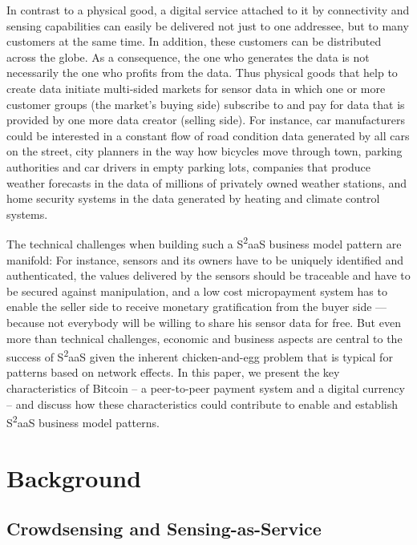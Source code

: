 In contrast to a physical good, a digital service attached to it by connectivity and sensing capabilities can easily be delivered not just to one addressee, but to many customers at the same time. In addition, these customers can be distributed across the globe. As a consequence, the one who generates the data is not necessarily the one who profits from the data. Thus physical goods that help to create data initiate multi-sided markets for sensor data in which one or more customer groups (the market’s buying side) subscribe to and pay for data that is provided by one more data creator (selling side). For instance, car manufacturers could be interested in a constant flow of road condition data generated by all cars on the street, city planners in the way how bicycles move through town, parking authorities and car drivers in empty parking lots, companies that produce weather forecasts in the data of millions of privately owned weather stations, and home security systems in the data generated by heating and climate control systems.

The technical challenges when building such a S\textsuperscript{2}aaS business model pattern are manifold: For instance, sensors and its owners have to be uniquely identified and authenticated, the values delivered by the sensors should be traceable and have to be secured against manipulation, and a low cost micropayment system has to enable the seller side to receive monetary gratification from the buyer side — because not everybody will be willing to share his sensor data for free. But even more than technical challenges, economic and business aspects are central to the success of S\textsuperscript{2}aaS \parencite{bohli2009initial} given the inherent chicken-and-egg problem that is typical for patterns based on network effects. In this paper, we present the key characteristics of Bitcoin -- a peer-to-peer payment system and a digital currency -- and discuss how these characteristics could contribute to enable and establish  S\textsuperscript{2}aaS business model patterns.

\section{Background}

\subsection{Crowdsensing and Sensing-as-Service}
\label{sec:crowdsensing}

